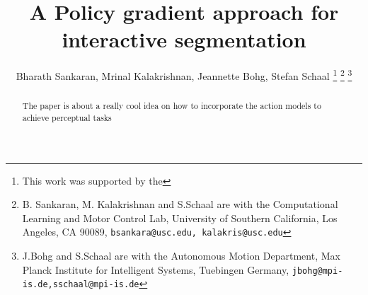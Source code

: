 \documentclass[letterpaper, 10pt, conference]{ieeeconf}
\begin{document}
\title{\LARGE \bf A Policy gradient approach for interactive segmentation}

\author{Bharath Sankaran, Mrinal Kalakrishnan, Jeannette Bohg, Stefan Schaal%
\thanks{This work was supported by the }%
\thanks{B. Sankaran, M. Kalakrishnan and S.Schaal are with the Computational Learning and Motor Control Lab, University of Southern California, Los Angeles, CA 90089, {\tt\small bsankara@usc.edu, kalakris@usc.edu}}%
\thanks{J.Bohg and S.Schaal are with the Autonomous Motion Department, Max Planck Institute for Intelligent Systems, Tuebingen Germany, {\tt\small jbohg@mpi-is.de,sschaal@mpi-is.de}}%
}
\maketitle


\begin{abstract}
The paper is about a really cool idea on how to incorporate the action models to achieve perceptual tasks
\end{abstract}










\end{document}
